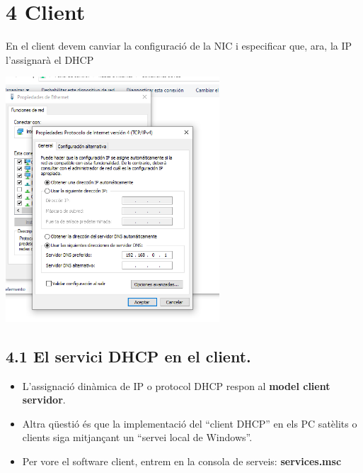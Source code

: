 \documentclass[
  a4paper,
]{article}
\providecommand{\tightlist}{%
  \setlength{\itemsep}{0pt}\setlength{\parskip}{0pt}}
\begin{document}
\section{4 Client}\label{client}

En el client devem canviar la configuració de la NIC i especificar que,
ara, la IP l'assignarà el DHCP

\includegraphics[width=0.6\textwidth,height=\textheight]{png/DHCP14.png}

\subsection{4.1 El servici DHCP en el
client.}\label{el-servici-dhcp-en-el-client.}

\begin{itemize}
\tightlist
\item
  L'assignació dinàmica de IP o protocol DHCP respon al \textbf{model
  client servidor}.
\item
  Altra qüestió és que la implementació del ``client DHCP'' en els PC
  satèlits o clients siga mitjançant un ``servei local de Windows''.
\item
  Per vore el software client, entrem en la consola de serveis:
  \textbf{services.msc}
\end{itemize}
\end{document}
